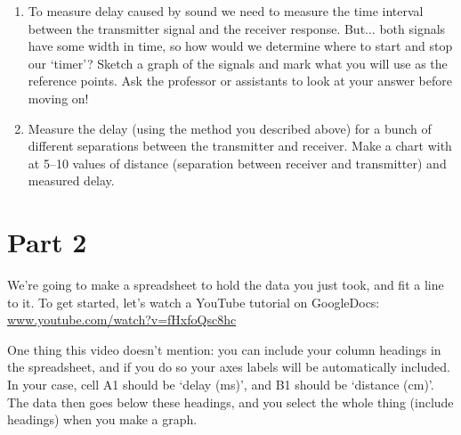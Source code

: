 \documentclass[12pt, letterpaper]{article}
\begin{document}
\begin{enumerate}
	\item To measure delay caused by sound we need to measure the time interval between the transmitter signal and the receiver response.
	But... both signals have some width in time, so how would we determine where to start and stop our `timer'?
	Sketch a graph of the signals and mark what you will use as the reference points.
	Ask the professor or assistants to look at your answer before moving on!

	\fillanswergrid
	\item Measure the delay (using the method you described above) for a bunch of different separations between the transmitter and receiver.
	Make a chart with at 5--10 values of distance (separation between receiver and transmitter) and measured delay.

	\fillanswergrid
\end{enumerate}



\section{Part 2}

We're going to make a spreadsheet to hold the data you just took, and fit a line to it.
To get started, let's watch a YouTube tutorial on GoogleDocs:\\ \href{https://www.youtube.com/watch?v=fHxfoQsc8hc}{www.youtube.com/watch?v=fHxfoQsc8hc}

One thing this video doesn't mention: you can include your column headings in the spreadsheet, and if you do so your axes labels will be automatically included.
In your case, cell A1 should be `delay (ms)', and B1 should be `distance (cm)'.
The data then goes below these headings, and you select the whole thing (include headings) when you make a graph.
\end{document}
